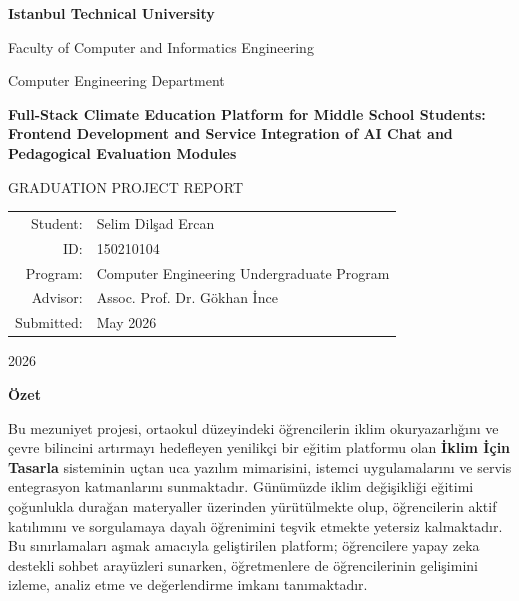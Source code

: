 \documentclass[12pt,a4paper,oneside]{report}
\newcommand{\university}{Istanbul Technical University}
\newcommand{\faculty}{Faculty of Computer and Informatics Engineering}
\newcommand{\department}{Computer Engineering Department}
\newcommand{\program}{Computer Engineering Undergraduate Program}
\newcommand{\thesistitle}{Full-Stack Climate Education Platform for Middle School Students: Frontend Development and Service Integration of AI Chat and Pedagogical Evaluation Modules}
\newcommand{\studentname}{Selim Dilşad Ercan}
\newcommand{\studentnumber}{150210104}
\newcommand{\advisor}{Assoc. Prof. Dr. Gökhan İnce}
\newcommand{\thesisyear}{2026}
\newcommand{\submissiondate}{May 2026}
\begin{document}

    \begin{titlepage}
        \centering
        \vspace*{1cm}
        {\Large \textbf{\university}\par}
        \vspace{0.4cm}
        {\large \faculty\par}
        {\large \department\par}
        \vspace{2cm}
        {\huge \textbf{\thesistitle}\par}
        \vspace{1.5cm}
        {\Large GRADUATION PROJECT REPORT\par}
        \vspace{2.5cm}
        \begin{tabular}{rl}
            Student:   & \studentname \\
            ID:        & \studentnumber \\
            Program:   & \program \\
            Advisor:   & \advisor \\
            Submitted: & \submissiondate \\
        \end{tabular}
        \vfill
        {\large \thesisyear\par}
    \end{titlepage}



    \setcounter{page}{2}

    \clearpage
    \begin{center}
        {\LARGE\bfseries Özet}\par\vspace{1.2em}
    \end{center}

    Bu mezuniyet projesi, ortaokul düzeyindeki öğrencilerin iklim okuryazarlığını ve çevre bilincini artırmayı hedefleyen yenilikçi bir eğitim platformu olan \textbf{İklim İçin Tasarla} sisteminin uçtan uca yazılım mimarisini, istemci uygulamalarını ve servis entegrasyon katmanlarını sunmaktadır. Günümüzde iklim değişikliği eğitimi çoğunlukla durağan materyaller üzerinden yürütülmekte olup, öğrencilerin aktif katılımını ve sorgulamaya dayalı öğrenimini teşvik etmekte yetersiz kalmaktadır. Bu sınırlamaları aşmak amacıyla geliştirilen platform; öğrencilere yapay zeka destekli sohbet arayüzleri sunarken, öğretmenlere de öğrencilerinin gelişimini izleme, analiz etme ve değerlendirme imkanı tanımaktadır. 
\end{document}
